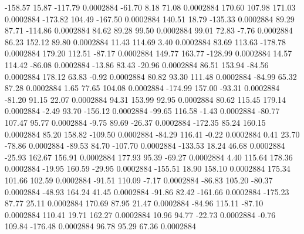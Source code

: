      -158.57       15.87     -117.79     0.0002884
      -61.70        8.18       71.08     0.0002884
      170.60      107.98      171.03     0.0002884
     -173.82      104.49     -167.50     0.0002884
      140.51       18.79     -135.33     0.0002884
       89.29       87.71     -114.86     0.0002884
       84.62       89.28       99.50     0.0002884
       99.01       72.83       -7.76     0.0002884
       86.23      152.12       89.80     0.0002884
       11.43      114.69        3.40     0.0002884
       83.69      113.63     -178.78     0.0002884
      179.20      112.51      -87.17     0.0002884
      149.77      163.77     -128.99     0.0002884
       14.57      114.42      -86.08     0.0002884
      -13.86       83.43      -20.96     0.0002884
       86.51      153.94      -84.56     0.0002884
      178.12       63.83       -0.92     0.0002884
       80.82       93.30      111.48     0.0002884
      -84.99       65.32       87.28     0.0002884
        1.65       77.65      104.08     0.0002884
     -174.99      157.00      -93.31     0.0002884
      -81.20       91.15       22.07     0.0002884
       94.31      153.99       92.95     0.0002884
       80.62      115.45      179.14     0.0002884
       -2.49       93.70     -156.12     0.0002884
      -99.65      116.58       -1.43     0.0002884
      -80.77      107.47       95.77     0.0002884
       -9.75       89.69      -26.37     0.0002884
     -172.35       85.24      160.15     0.0002884
       85.20      158.82     -109.50     0.0002884
      -84.29      116.41       -0.22     0.0002884
        0.41       23.70      -78.86     0.0002884
      -89.53       84.70     -107.70     0.0002884
     -133.53       18.24       46.68     0.0002884
      -25.93      162.67      156.91     0.0002884
      177.93       95.39      -69.27     0.0002884
        4.40      115.64      178.36     0.0002884
      -19.95      160.59      -29.95     0.0002884
     -155.51       18.90      158.10     0.0002884
      175.34      101.66      102.59     0.0002884
      -91.51      110.09       -7.17     0.0002884
      -86.83      105.20      -80.37     0.0002884
      -48.93      164.24       41.45     0.0002884
      -91.86       82.42     -161.66     0.0002884
     -175.23       87.77       25.11     0.0002884
      170.69       87.95       21.47     0.0002884
      -84.96      115.11      -87.10     0.0002884
      110.41       19.71      162.27     0.0002884
       10.96       94.77      -22.73     0.0002884
       -0.76      109.84     -176.48     0.0002884
       96.78       95.29       67.36     0.0002884
